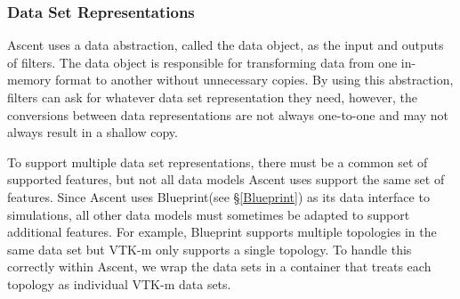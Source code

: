 \subsubsection{Data Set Representations}
Ascent uses a data abstraction, called the data object, as the input
and outputs of filters.
%
The data object is responsible for transforming data from one in-memory format
to another without unnecessary copies.
%
By using this abstraction, filters can ask for whatever data set
representation they need, however, the conversions between data
representations are not always one-to-one and may not always
result in a shallow copy.
%

To support multiple data set representations, there must be a common
set of supported features, but not all data models Ascent uses
support the same set of features.
%
Since Ascent uses Blueprint(see \S\ref{Blueprint}) as its data interface to simulations,
all other data models must sometimes be adapted to support additional
features.
%
For example, Blueprint supports multiple topologies in the same data set
but VTK-m only supports a single topology.
%
To handle this correctly within Ascent, we wrap the data sets in a container
that treats each topology as individual VTK-m data sets.
%
